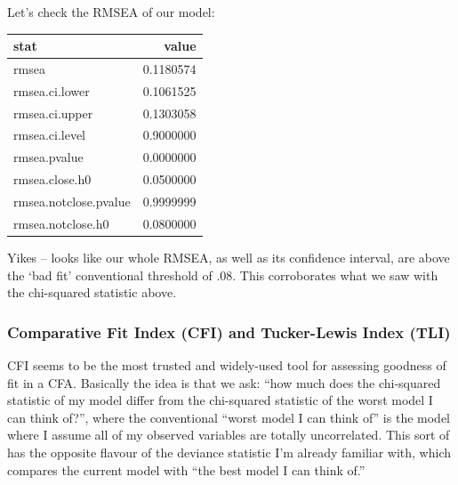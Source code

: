 \documentclass[
  letterpaper,
  DIV=11,
  numbers=noendperiod]{scrreprt}
\newenvironment{Shaded}{\begin{snugshade}}{\end{snugshade}}
\newcommand{\AttributeTok}[1]{\textcolor[rgb]{0.40,0.45,0.13}{#1}}
\newcommand{\CommentTok}[1]{\textcolor[rgb]{0.37,0.37,0.37}{#1}}
\newcommand{\FunctionTok}[1]{\textcolor[rgb]{0.28,0.35,0.67}{#1}}
\newcommand{\NormalTok}[1]{\textcolor[rgb]{0.00,0.23,0.31}{#1}}
\newcommand{\SpecialCharTok}[1]{\textcolor[rgb]{0.37,0.37,0.37}{#1}}
\newcommand{\StringTok}[1]{\textcolor[rgb]{0.13,0.47,0.30}{#1}}
\begin{document}
Let's check the RMSEA of our model:

\begin{Shaded}
\end{Shaded}

\begin{longtable}[]{@{}lr@{}}
\toprule()
stat & value \\
\midrule()
\endhead
rmsea & 0.1180574 \\
rmsea.ci.lower & 0.1061525 \\
rmsea.ci.upper & 0.1303058 \\
rmsea.ci.level & 0.9000000 \\
rmsea.pvalue & 0.0000000 \\
rmsea.close.h0 & 0.0500000 \\
rmsea.notclose.pvalue & 0.9999999 \\
rmsea.notclose.h0 & 0.0800000 \\
\bottomrule()
\end{longtable}

Yikes -- looks like our whole RMSEA, as well as its confidence interval,
are above the `bad fit' conventional threshold of .08. This corroborates
what we saw with the chi-squared statistic above.

\hypertarget{comparative-fit-index-cfi-and-tucker-lewis-index-tli}{%
\subsubsection*{Comparative Fit Index (CFI) and Tucker-Lewis Index
(TLI)}\label{comparative-fit-index-cfi-and-tucker-lewis-index-tli}}

CFI seems to be the most trusted and widely-used tool for assessing
goodness of fit in a CFA. Basically the idea is that we ask: ``how much
does the chi-squared statistic of my model differ from the chi-squared
statistic of the worst model I can think of?'', where the conventional
``worst model I can think of'' is the model where I assume all of my
observed variables are totally uncorrelated. This sort of has the
opposite flavour of the deviance statistic I'm already familiar with,
which compares the current model with ``the best model I can think of.''
\end{document}
